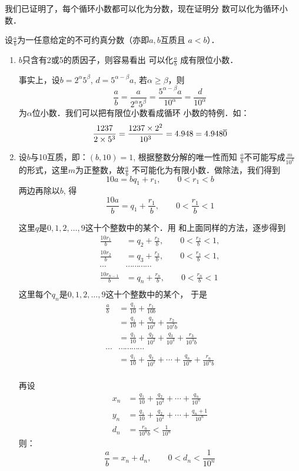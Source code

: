 我们已证明了，每个循环小数都可以化为分数，现在证明分
数可以化为循环小数．

设$\frac{a}{b}$为一任意给定的不可约真分数（亦即$a,b$互质且
$a<b$）．
\begin{enumerate}
    \item $b$只含有2或5的质因子，则容易看出
可以化$\frac{a}{b}$
成有限位小数．

事实上，设$b=2^{\alpha}5^{\beta}$, $d=5^{\alpha-\beta}a$, 若$\alpha\ge \beta$，则
$$\frac{a}{b}=\frac{a}{2^{\alpha}5^{\beta}}=\frac{5^{\alpha-\beta}a}{10^{\alpha}}=\frac{d}{10^{\alpha}}$$
为$\alpha$位小数．我们可以把有限位小数看成循环
小数的特例．如：
\[\dfrac{1237}{2\times 5^3}=\dfrac{1237\times 2^2}{10^3}=4.948=4.948\overline{0}\]

\item 设$b$与10互质，即：$(b,10)=1$, 根据整数分解的唯一性而知
$\frac{a}{b}$不可能写成$\frac{m}{10^k}$
的形式，这里$m$为正整数，故$\frac{a}{b}$
不可能化为有限小数．做除法，我们得到
\[10a=bq_1+r_1,\qquad 0<r_1<b\]
两边再除以$b$, 得
\[\frac{10a}{b}=q_1+\frac{r_1}{b},\qquad 0<\frac{r_1}{b}<1\]

这里$q$是$0,1,2,\ldots,9$这十个整数中的某个．用
和上面同样的方法，逐步得到
\[\begin{split}
    \frac{10r_1}{b}&=q_2+\frac{r_2}{b},\qquad 0<\frac{r_2}{b}<1,\\
    \frac{10r_2}{b}&=q_3+\frac{r_3}{b},\qquad 0<\frac{r_3}{b}<1,\\
\cdots &\cdots \cdots \cdots \cdots \\
    \frac{10r_{n-1}}{b}&=q_n+\frac{r_n}{b},\qquad 0<\frac{r_n}{b}<1\\
\end{split}\]
这里每个$q_n$是$0,1,2,\ldots,9$这十个整数中的某个，
于是
\[\begin{split}
    \frac{a}{b}&=\frac{q_1}{10}+\frac{r_1}{10b}\\
    &=\frac{q_1}{10}+\frac{q_2}{10^2}+\frac{r_2}{10^2b}\\
    &=\frac{q_1}{10}+\frac{q_2}{10^2}+\frac{q_3}{10^3}+\frac{r_3}{10^3b}\\
    \cdots &\cdots \cdots \cdots \cdots \\
    &=\frac{q_1}{10}+\frac{q_2}{10^2}+\cdots+\frac{q_n}{10^n}+\frac{r_n}{10^n b}\\
\end{split}\]

再设
\[\begin{split}
    x_n&=\frac{q_1}{10}+\frac{q_2}{10^2}+\cdots+\frac{q_n}{10^n}\\
    y_n&=\frac{q_1}{10}+\frac{q_2}{10^2}+\cdots+\frac{q_n+1}{10^n}\\
    d_n&=\frac{r_n}{10^n b}<\frac{1}{10^n}
\end{split}\]
则：
\[\frac{a}{b}=x_n+d_n,\qquad 0<d_n<\frac{1}{10^n}\]


\end{enumerate}

